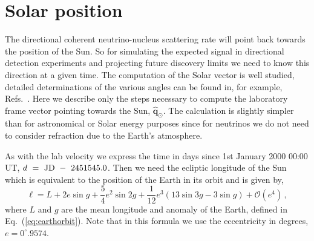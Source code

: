\chapter{Solar position}\label{app:solar}
The directional coherent neutrino-nucleus scattering rate will point back towards the position of the Sun. So for simulating the expected signal in directional detection experiments and projecting future discovery limits we need to know this direction at a given time. The computation of the Solar vector is well studied, detailed determinations of the various angles can be found in, for example, Refs.~\cite{Jenkins:2008sp,BlancoMuriel2001431}. Here we describe only the steps necessary to compute the laboratory frame vector pointing towards the Sun, $\hat{\textbf{q}}_\odot$. The calculation is slightly simpler than for astronomical or Solar energy purposes since for neutrinos we do not need to consider refraction due to the Earth's atmosphere.

As with the lab velocity we express the time in days since 1st January 2000 00:00 UT, $d~=~{\rm JD}~-~2451545.0$. Then we need the ecliptic longitude of the Sun which is equivalent to the position of the Earth in its orbit and is given by,
\begin{equation}
 \ell = L + 2 e \sin{g} + \frac{5}{4} e^2 \sin{2g} + \frac{1}{12}e^3\left(13 \sin{3g} - 3 \sin{g} \right) + \mathcal{O}(e^4)\, ,
\end{equation}
where $L$ and $g$ are the mean longitude and anomaly of the Earth, defined in Eq.~(\ref{eq:earthorbit}). Note that in this formula we use the eccentricity in degrees, $e = 0^\circ.9574$.

